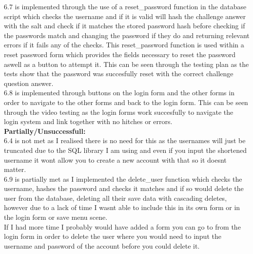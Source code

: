 \documentclass{article}
\begin{document}
        6.7 is implemented through the use of a reset\_password function in the database script which checks the username and if it is valid will hash the challenge answer with the salt and check if it matches the stored password hash before checking if the passwords match and changing the password if they do and returning relevant errors if it fails any of the checks. This reset\_password function is used within a reset password form which provides the fields necessary to reset the password aswell as a button to attempt it. This can be seen through the testing plan as the tests show that the password was succesfully reset with the correct challenge question answer.\\
        6.8 is implemented through buttons on the login form and the other forms in order to navigate to the other forms and back to the login form. This can be seen through the video testing as the login forms work succesfully to navigate the login system and link together with no hitches or errors.\\
        \textbf{Partially/Unsuccessfull:}\\
        6.4 is not met as I realised there is no need for this as the usernames will just be truncated due to the SQL library I am using and even if you input the shortened username it wont allow you to create a new account with that so it doesnt matter.\\
        6.9 is partially met as I implemented the delete\_user function which checks the username, hashes the password and checks it matches and if so would delete the user from the database, deleting all their save data with cascading deletes, however due to a lack of time I wasnt able to include this in its own form or in the login form or save menu scene.\\
        If I had more time I probably would have added a form you can go to from the login form in order to delete the user where you would need to input the username and password of the account before you could delete it.\\
\end{document}
